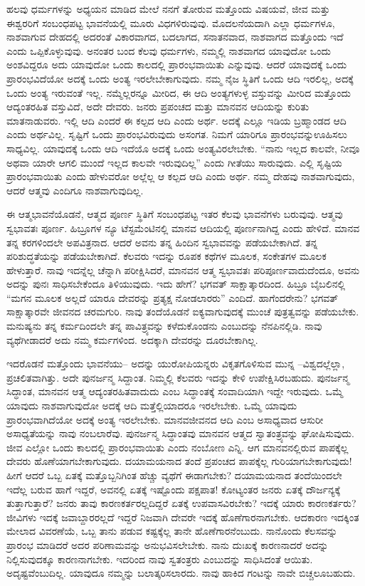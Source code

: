 ಹಲವು ಧರ್ಮಗಳನ್ನು ಅಧ್ಯಯನ ಮಾಡಿದ ಮೇಲೆ ನನಗೆ ತೋರುವ ಮತ್ತೊಂದು ವಿಷಯವೆ, ಜೀವ ಮತ್ತು ಈಶ್ವರರಿಗೆ ಸಂಬಂಧಪಟ್ಟ ಭಾವನೆಯಲ್ಲಿ ಮೂರು ವಿಧಗಳಿರುವುವು. ಮೊದಲನೆಯದಾಗಿ ಎಲ್ಲಾ ಧರ್ಮಗಳೂ, ನಾಶವಾಗುವ ದೇಹದಲ್ಲಿ ಅದರಂತೆ ವಿಕಾರವಾಗದ, ಬದಲಾಗದ, ಸನಾತನವಾದ, ನಾಶವಾಗದ ಮತ್ತೊಂದು ಇದೆ ಎಂದು ಒಪ್ಪಿಕೊಳ್ಳುವುವು. ಅನಂತರ ಬಂದ ಕೆಲವು ಧರ್ಮಗಳು, ನಮ್ಮಲ್ಲಿ ನಾಶವಾಗದ ಯಾವುದೋ ಒಂದು ಅಂಶವಿದ್ದರೂ ಅದು ಯಾವುದೋ ಒಂದು ಕಾಲದಲ್ಲಿ ಪ್ರಾರಂಭವಾಯಿತು ಎನ್ನುವುವು. ಆದರೆ ಯಾವುದಕ್ಕೆ ಒಂದು ಪ್ರಾರಂಭವಿದೆಯೋ ಅದಕ್ಕೆ ಒಂದು ಅಂತ್ಯ ಇರಲೇಬೇಕಾಗುವುದು. ನಮ್ಮ ನೈಜ ಸ್ಥಿತಿಗೆ ಒಂದು ಆದಿ ಇರಲಿಲ್ಲ, ಅದಕ್ಕೆ ಒಂದು ಅಂತ್ಯ ಇರುವಂತೆ ಇಲ್ಲ. ನಮ್ಮೆಲ್ಲರನ್ನೂ ಮೀರಿದ, ಈ ಆದಿ ಅಂತ್ಯಗಳುಳ್ಳ ವಸ್ತುವನ್ನು ಮೀರಿದ ಮತ್ತೊಂದು ಆದ್ಯಂತರಹಿತ ವಸ್ತುವಿದೆ, ಅದೇ ದೇವರು. ಜನರು ಪ್ರಪಂಚದ ಮತ್ತು ಮಾನವನ ಆದಿಯನ್ನು ಕುರಿತು ಮಾತನಾಡುವರು. ಇಲ್ಲಿ ಆದಿ ಎಂದರೆ ಈ ಕಲ್ಪದ ಆದಿ ಎಂದು ಅರ್ಥ. ಅದಕ್ಕೆ ಎಲ್ಲೂ ಇಡಿಯ ಬ್ರಹ್ಮಾಂಡದ ಆದಿ ಎಂದು ಅರ್ಥವಿಲ್ಲ. ಸೃಷ್ಟಿಗೆ ಒಂದು ಪ್ರಾರಂಭವಿರುವುದು ಅಸಂಗತ. ನಿಮಗೆ ಯಾರಿಗೂ ಪ್ರಾರಂಭವನ್ನು\break ಊಹಿಸಲು ಸಾಧ್ಯವಿಲ್ಲ. ಯಾವುದಕ್ಕೆ ಒಂದು ಆದಿ ಇದೆಯೊ ಅದಕ್ಕೆ ಒಂದು ಅಂತ್ಯವಿರಲೇಬೇಕು. “ನಾನು ಇಲ್ಲದ ಕಾಲವೇ, ನೀವೂ ಅಥವಾ ಯಾರೇ ಆಗಲಿ ಮುಂದೆ ಇಲ್ಲದ ಕಾಲವೇ ಇರುವುದಿಲ್ಲ” ಎಂದು ಗೀತೆಯು ಸಾರುವುದು. ಎಲ್ಲಿ ಸೃಷ್ಟಿಯ ಪ್ರಾರಂಭವಾಯಿತು ಎಂದು ಹೇಳುವರೋ ಅಲ್ಲೆಲ್ಲ ಆ ಕಲ್ಪದ ಆದಿ ಎಂದು ಅರ್ಥ. ನಮ್ಮ ದೇಹವು ನಾಶವಾಗುವುದು, ಆದರೆ ಆತ್ಮವು ಎಂದಿಗೂ ನಾಶವಾಗುವುದಿಲ್ಲ.

ಈ ಆತ್ಮಭಾವನೆಯೊಡನೆ, ಆತ್ಮದ ಪೂರ್ಣ ಸ್ಥಿತಿಗೆ ಸಂಬಂಧಪಟ್ಟ ಇತರ ಕೆಲವು ಭಾವನೆಗಳು ಬರುವುವು. ಆತ್ಮವು ಸ್ವಭಾವತಃ ಪೂರ್ಣ. ಹಿಬ್ರೂಗಳ ನ್ಯೂ ಟೆಸ್ಟಮೆಂಟಿನಲ್ಲಿ ಮಾನವ ಆದಿಯಲ್ಲಿ ಪೂರ್ಣನಾಗಿದ್ದ ಎಂದು ಹೇಳಿದೆ. ಮಾನವ ತನ್ನ ಕರಗಳಿಂದಲೇ ಅಪವಿತ್ರನಾದ. ಆದರೆ ಅವನು ತನ್ನ ಹಿಂದಿನ ಸ್ವಭಾವವನ್ನು ಪಡೆಯಬೇಕಾಗಿದೆ. ತನ್ನ ಪರಿಶುದ್ಧತೆಯನ್ನು ಪಡೆಯಬೇಕಾಗಿದೆ. ಕೆಲವರು ಇದನ್ನು ರೂಪಕ ಕಥೆಗಳ ಮೂಲಕ, ಸಂಕೇತಗಳ ಮೂಲಕ ಹೇಳುತ್ತಾರೆ. ನಾವು ಇದನ್ನೆಲ್ಲ ಚೆನ್ನಾಗಿ ಪರೀಕ್ಷಿಸಿದರೆ, ಮಾನವನ ಆತ್ಮ ಸ್ವಭಾವತಃ ಪರಿಪೂರ್ಣವಾದುದೆಂದೂ, ಅವನು ಅದನ್ನು ಪುನಃ ಸಾಧಿಸಬೇಕೆಂದೂ ತಿಳಿಯುವುದು. ಇದು ಹೇಗೆ? ಭಗವತ್ ಸಾಕ್ಷಾತ್ಕಾರದಿಂದ. ಹಿಬ್ರೂ ಬೈಬಲಿನಲ್ಲಿ “ಮಗನ ಮೂಲಕ ಅಲ್ಲದೆ ಯಾರೂ ದೇವರನ್ನು ಪ್ರತ್ಯಕ್ಷ ನೋಡಲಾರರು'' ಎಂದಿದೆ. ಹಾಗೆಂದರೇನು? ಭಗವತ್ ಸಾಕ್ಷಾತ್ಕಾರವೇ ಜೀವನದ ಚರಮಗುರಿ. ನಾವು ತಂದೆಯೊಡನೆ ಐಕ್ಯವಾಗುವುದಕ್ಕೆ ಮುಂಚೆ ಪುತ್ರತ್ವವನ್ನು ಪಡೆಯಬೇಕು. ಮನುಷ್ಯನು ತನ್ನ ಕರ್ಮದಿಂದಲೇ ತನ್ನ ಪಾವಿತ್ರ್ಯವನ್ನು ಕಳೆದುಕೊಂಡನು ಎಂಬುದನ್ನು ನೆನಪಿನಲ್ಲಿಡಿ. ನಾವು ವ್ಯಥೆಗೀಡಾದರೆ ಅದು ನಮ್ಮ ಕರ್ಮಗಳಿಂದ. ಅದಕ್ಕಾಗಿ ದೇವರನ್ನು ದೂರಬೇಕಾಗಿಲ್ಲ.

ಇದರೊಡನೆ ಮತ್ತೊಂದು ಭಾವನೆಯು– ಅದನ್ನು ಯುರೋಪಿಯನ್ನರು ವಿಕೃತಗೊಳಿಸುವ ಮುನ್ನ –ವಿಶ್ವದಲ್ಲೆಲ್ಲಾ, ಪ್ರಚಲಿತವಾಗಿತ್ತು. ಅದೇ ಪುನರ್ಜನ್ಮ ಸಿದ್ದಾಂತ. ನಿಮ್ಮಲ್ಲಿ ಕೆಲವರು ಇದನ್ನು ಕೇಳಿ ಉಪೇಕ್ಷಿಸಿರಬಹುದು. ಪುನರ್ಜನ್ಮ ಸಿದ್ಧಾಂತ, ಮಾನವನ ಆತ್ಮ ಆದ್ಯಂತರಹಿತವಾದುದು ಎಂಬ ಸಿದ್ಧಾಂತಕ್ಕೆ ಸಂವಾದಿಯಾಗಿ ಇದ್ದೇ ಇರುವುದು. ಒಮ್ಮೆ ಯಾವುದು ನಾಶವಾಗುವುದೋ ಅದಕ್ಕೆ ಆದಿ ಮತ್ತೆಲ್ಲಿಯಾದರೂ ಇರಲೇಬೇಕು. ಒಮ್ಮೆ ಯಾವುದು ಪ್ರಾರಂಭವಾಗಿದೆಯೋ ಅದಕ್ಕೆ ಅಂತ್ಯ ಇರಲೇಬೇಕು. ಮಾನವಜೀವನದ ಆದಿ ಎಂಬ ಅಸಾಧ್ಯವಾದ ಆಸುರೀ ಅಸಾಧ್ಯತೆಯನ್ನು ನಾವು ನಂಬಲಾರೆವು. ಪುನರ್ಜನ್ಮ ಸಿದ್ಧಾಂತವು ಮಾನವನ ಆತ್ಮದ ಸ್ವಾತಂತ್ರ್ಯವನ್ನು ಘೋಷಿಸುವುದು. ಜೀವ ಎಲ್ಲೋ ಒಂದು ಕಾಲದಲ್ಲಿ ಪ್ರಾರಂಭವಾಯಿತು ಎಂದು ನಂಬೋಣ ಎನ್ನಿ. ಆಗ ಮಾನವನಲ್ಲಿರುವ ಪಾಪಕ್ಕೆಲ್ಲ ದೇವರು ಹೊಣೆಯಾಗಬೇಕಾಗುವುದು. ದಯಾಮಯನಾದ ತಂದೆ ಪ್ರಪಂಚದ ಪಾಪಕ್ಕೆಲ್ಲ ಗುರಿಯಾಗಬೇಕಾಗುವುದು! ಹೀಗೆ ಆದರೆ ಒಬ್ಬ ಏತಕ್ಕೆ ಮತ್ತೊಬ್ಬನಿಗಿಂತ ಹೆಚ್ಚು ವ್ಯಥೆಗೆ ಈಡಾಗಬೇಕು? ದಯಾಮಯನಾದ ತಂದೆಯಿಂದಲೇ ಇದೆಲ್ಲ ಬರುವ ಹಾಗೆ ಇದ್ದರೆ, ಅವನಲ್ಲಿ ಏತಕ್ಕೆ ಇಷ್ಟೊಂದು ಪಕ್ಷಪಾತ! ಕೋಟ್ಯಂತರ ಜನರು ಏತಕ್ಕೆ ದೌರ್ಜನ್ಯಕ್ಕೆ ತುತ್ತಾಗುತ್ತಾರೆ? ಜನರು ತಾವು ಕಾರಣಕರ್ತರಲ್ಲದಿದ್ದರೆ ಏತಕ್ಕೆ ಉಪವಾಸವಿರಬೇಕು? ಇದಕ್ಕೆ ಯಾರು ಕಾರಣಕರ್ತರು? ಜೀವಿಗಳು ಇದಕ್ಕೆ ಜವಾಬ್ದಾರರಲ್ಲದೆ ಇದ್ದರೆ ನಿಜವಾಗಿ ದೇವರೇ ಇದಕ್ಕೆ ಹೊಣೆಗಾರನಾಗಬೇಕು. ಆದಕಾರಣ ಇದಕ್ಕಿಂತ ಮೇಲಾದ ವಿವರಣೆಯೆ, ಒಬ್ಬ ತಾನು ಪಡುವ ಕಷ್ಟಕ್ಕೆಲ್ಲ ತಾನೇ ಹೊಣೆಗಾರನೆಂಬುದು. ನಾನೊಂದು ಕೆಲಸವನ್ನು ಪ್ರಾರಂಭ ಮಾಡಿದರೆ ಅದರ ಪರಿಣಾಮವನ್ನು ಅನುಭವಿಸಲೇಬೇಕು. ನಾನು ದುಃಖಕ್ಕೆ ಕಾರಣನಾದರೆ ಅದನ್ನು ನಿಲ್ಲಿಸುವುದಕ್ಕೂ ಕಾರಣನಾಗಬೇಕು. ಇದರಿಂದ ನಾವು ಸ್ವತಂತ್ರರು ಎಂಬುದನ್ನು ಸಾಧಿಸಿದಂತೆ ಆಯಿತು. ಅದೃಷ್ಟವೆಂಬುದಿಲ್ಲ. ಯಾವುದೂ ನಮ್ಮನ್ನು ಬಲಾತ್ಕರಿಸಲಾರದು. ನಾವು ಹಾಕಿದ ಗಂಟನ್ನು ನಾವೇ ಬಿಚ್ಚಲೂಬಹುದು.

